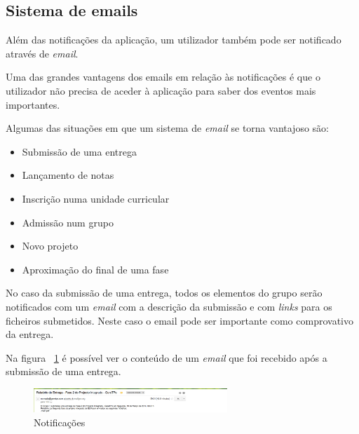 \subsection{Sistema de emails}

Além das notificações da aplicação, um utilizador também pode ser notificado através de \textit{email}.

Uma das grandes vantagens dos emails em relação às notificações é que o utilizador não precisa de aceder à aplicação para saber dos eventos mais importantes.

Algumas das situações em que um sistema de \textit{email} se torna  vantajoso são:

\begin{itemize}
	\item Submissão de uma entrega
	\item Lançamento de notas
	\item Inscrição numa unidade curricular
	\item Admissão num grupo
	\item Novo projeto
	\item Aproximação do final de uma fase
\end{itemize}

No caso da submissão de uma entrega, todos os elementos do grupo serão notificados com um \textit{email} com a descrição da submissão e com \textit{links} para os ficheiros submetidos. Neste caso o email pode ser importante como comprovativo da entrega.

Na figura ~\ref{fig:mail} é possível ver o conteúdo de um \textit{email} que foi recebido após a submissão de uma entrega.

\begin{figure}[H]
	\centering
	\includegraphics[width=0.65\textwidth,center]{images/implementacao/alunos/emails}
	\caption{Notificações}
	\label{fig:mail}
\end{figure}
